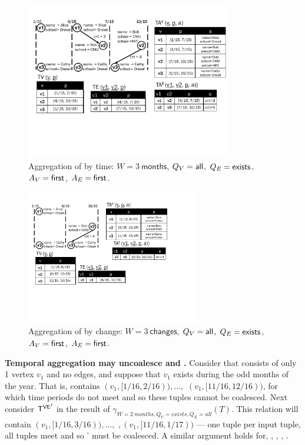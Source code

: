 \begin{figure}[t!]
\includegraphics[width=3.5in]{figs/agg1.pdf}
\caption{Aggregation of  by time:
  $W=3~\textsf{months}$, $Q_V=\textsf{all}$, $Q_E=\textsf{exists}$,
  $A_V=\textsf{first}$, $A_E=\textsf{first}$.}
\vspace{-0.2cm}
\label{fig:tg_agg1}
\vspace{-0.5cm}
\end{figure}

\begin{figure}[t!]
\includegraphics[width=3in]{figs/agg2.pdf}
\caption{Aggregation of  by change:
  $W=3~\textsf{changes}$, $Q_V=\textsf{all}$, $Q_E=\textsf{exists}$,
  $A_V=\textsf{first}$, $A_E=\textsf{first}$.}
\vspace{-0.2cm}
\label{fig:tg_agg2}
\vspace{-0.5cm}
\end{figure}

{\bf Temporal aggregation may uncoalesce \tve and \trg.}  Consider
 that consists of only 1 vertex $v_1$ and no edges, and
suppose that $v_1$ exists during the odd months of the year.  That is,
\tv contains $(v_1, [1/16, 2/16)), \ldots,$ $(v_1, [11/16,12/16))$,
    for which time periods do not meet and so these tuples cannot be
    coalesced.  Next consider $\mathsf{T^{VE}}'$ in the result of
    $\gamma_{W=2~months, Q_V=exists,Q_E=all}(T)$.  This relation will
    contain $(v_1, [1/16, 3/16)), \ldots,$ $,(v_1, [11/16,1/17))$ ---
        one tuple per input tuple, all tuples meet and so \tv' must be
        coalesced.  A similar argument holds for, \te, \tav, \tae,
        \trg.

